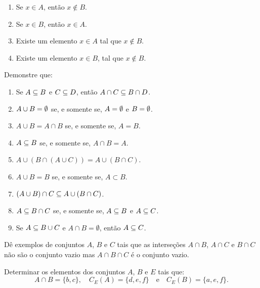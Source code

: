 \documentclass[12pt]{exam}
\begin{document}
    \begin{enumerate}[label={\roman*})]
        \item Se $x \in A$, então $x \notin B$.

        \item Se $x \in B$, então $x \in A$.

        \item Existe um elemento $x \in A$ tal que $x \notin B$.

        \item Existe um elemento $x \in B$, tal que $x \notin B$.
    \end{enumerate}
    \questao{} Demonstre que:
    \begin{enumerate}[label={\alph*})]
        \item Se $A \subseteq B$ e $C \subseteq D$, então $A \cap C \subseteq B \cap D$.

        \item $A \cup B = \emptyset$ se, e somente se, $A = \emptyset$ e $B = \emptyset$.

        \item $A \cup B = A \cap B$ se, e somente se,  $A = B$.

        \item $A \subseteq B$ se, e somente se,  $A \cap B = A$.

        \item $A \cup (B \cap (A \cup C)) = A \cup (B \cap C)$.

        \item $A \cup B = B$ se, e somente se, $A \subset B$.

        \item $(A \cup B) \cap C \subseteq A \cup (B \cap C)$.

        \item $A \subseteq B \cap C$ se, e somente se, $A \subseteq B$ e $A \subseteq C$.

        \item Se $A \subseteq B \cup C$ e $A \cap B = \emptyset$, então $A \subseteq C$.
    \end{enumerate}

    \questao{} Dê exemplos de conjuntos $A$, $B$ e $C$ tais que as interseções $A \cap B$, $A \cap C$ e $B \cap C$ não são o conjunto vazio mas $A \cap B \cap C$ é o conjunto vazio.

    \vspace{.3cm}

    \questao{} Determinar os elementos dos conjuntos $A$, $B$ e $E$ tais que:
    \[
        A \cap B = \{b, c\}, \quad C_E(A) = \{d, e, f\} \quad \mbox{e}\quad C_E(B) = \{a          , e, f\}.
    \]
\end{document}
